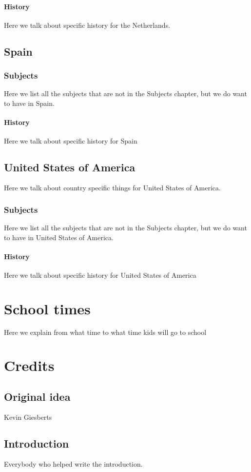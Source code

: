 \documentclass[titlepage]{article}
\begin{document}
\paragraph{History}
Here we talk about specific history for the Netherlands.

\subsection{Spain}
\subsubsection{Subjects}
Here we list all the subjects that are not in the Subjects chapter, but we do want to have in Spain.
\paragraph{History}
Here we talk about specific history for Spain

\subsection{United States of America}
Here we talk about country specific things for United States of America.
\subsubsection{Subjects}
Here we list all the subjects that are not in the Subjects chapter, but we do want to have in United States of America.
\paragraph{History}
Here we talk about specific history for United States of America

\newpage
\section{School times}
Here we explain from what time to what time kids will go to school

\newpage
\section{Credits}
\subsection{Original idea}
Kevin Giesberts
\subsection{Introduction}
Everybody who helped write the introduction.
\end{document}
